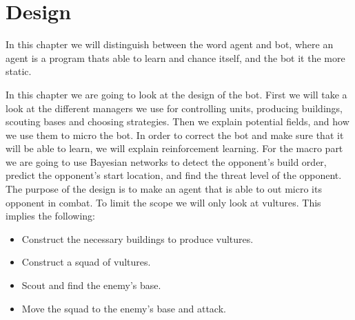 \chapter{Design}\label{design}
	In this chapter we will distinguish between the word agent and bot, where an agent is a program thats able to learn and chance itself, and the bot it the more static.
	
	In this chapter we are going to look at the design of the bot. First we will take a look at the different managers we use for controlling units, producing buildings, scouting bases and choosing strategies. Then we explain potential fields, and how we use them to micro the bot. In order to correct the bot and make sure that it will be able to learn, we will explain reinforcement learning. For the macro part we are going to use Bayesian networks to detect the opponent's build order, predict the opponent's start location, and find the threat level of the opponent.	\\
	The purpose of the design is to make an agent that is able to out micro its opponent in combat. To limit the scope we will only look at vultures. 
	This implies the following:
	\begin{itemize}
		\item Construct the necessary buildings to produce vultures.
		\item Construct a squad of vultures.
		\item Scout and find the enemy's base.
		\item Move the squad to the enemy's base and attack.
	\end{itemize}
	
	
	
	
	
	
	
	
